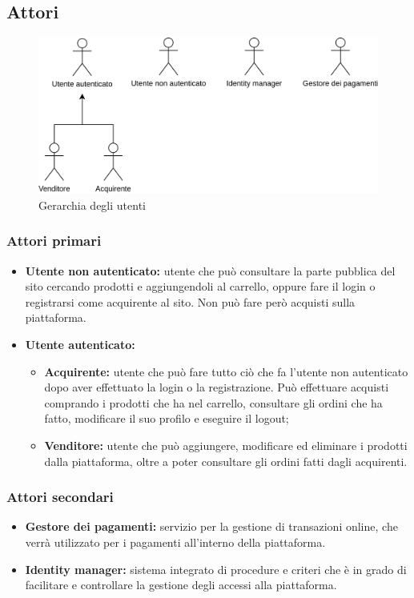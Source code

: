 \subsection{Attori} \label{Attori}

\begin{figure}[ht]
    \centering
    \includegraphics[width=\textwidth]{Immagini/DiagrammiUC/Attori.png}
    \caption{Gerarchia degli utenti} 
    \label{fig:attori}
\end{figure}

\subsubsection{Attori primari}
\begin{itemize}
    \item \textbf{Utente non autenticato:} utente che può consultare la parte pubblica del sito cercando prodotti e aggiungendoli al carrello, oppure fare il login o registrarsi come acquirente al sito. Non può fare però acquisti sulla piattaforma.
    \item \textbf{Utente autenticato:}
    \begin{itemize}
        \item \textbf{Acquirente:} utente che può fare tutto ciò che fa l'utente non autenticato dopo aver effettuato la login o la registrazione. Può effettuare acquisti comprando i prodotti che ha nel carrello, consultare gli ordini che ha fatto, modificare il suo profilo e eseguire il logout;
        \item \textbf{Venditore:} utente che può aggiungere, modificare ed eliminare i prodotti dalla piattaforma, oltre a poter consultare gli ordini fatti dagli acquirenti.
    \end{itemize}
\end{itemize}
\subsubsection{Attori secondari}
\begin{itemize}
\item \textbf{Gestore dei pagamenti:} servizio per la gestione di transazioni online, che verrà utilizzato per i pagamenti all'interno della piattaforma.%
\item \textbf{Identity manager:} sistema integrato di procedure e criteri che è in grado di facilitare e controllare la gestione degli accessi alla piattaforma. 
\end{itemize}
